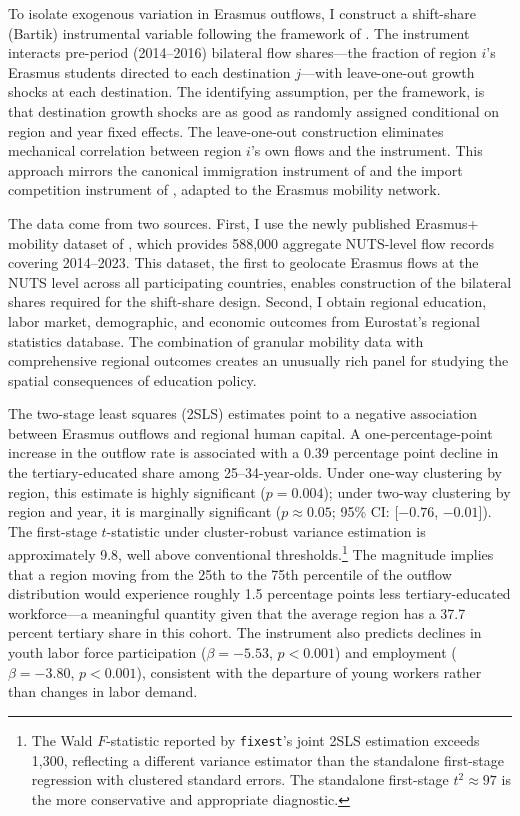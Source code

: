\documentclass[12pt]{article}
\begin{document}
To isolate exogenous variation in Erasmus outflows, I construct a shift-share (Bartik) instrumental variable following the framework of \citet{borusyak_hull_jaravel_2022}. The instrument interacts pre-period (2014--2016) bilateral flow shares---the fraction of region $i$'s Erasmus students directed to each destination $j$---with leave-one-out growth shocks at each destination. The identifying assumption, per the \citet{borusyak_hull_jaravel_2022} framework, is that destination growth shocks are as good as randomly assigned conditional on region and year fixed effects. The leave-one-out construction eliminates mechanical correlation between region $i$'s own flows and the instrument. This approach mirrors the canonical immigration instrument of \citet{card_2001} and the import competition instrument of \citet{autor_dorn_hanson_2013}, adapted to the Erasmus mobility network.

The data come from two sources. First, I use the newly published Erasmus+ mobility dataset of \citet{vaisanen_2025}, which provides 588,000 aggregate NUTS-level flow records covering 2014--2023. This dataset, the first to geolocate Erasmus flows at the NUTS level across all participating countries, enables construction of the bilateral shares required for the shift-share design. Second, I obtain regional education, labor market, demographic, and economic outcomes from Eurostat's regional statistics database. The combination of granular mobility data with comprehensive regional outcomes creates an unusually rich panel for studying the spatial consequences of education policy.

The two-stage least squares (2SLS) estimates point to a negative association between Erasmus outflows and regional human capital. A one-percentage-point increase in the outflow rate is associated with a 0.39 percentage point decline in the tertiary-educated share among 25--34-year-olds. Under one-way clustering by region, this estimate is highly significant ($p = 0.004$); under two-way clustering by region and year, it is marginally significant ($p \approx 0.05$; 95\% CI: [$-0.76$, $-0.01$]). The first-stage $t$-statistic under cluster-robust variance estimation is approximately 9.8, well above conventional thresholds.\footnote{The Wald $F$-statistic reported by \texttt{fixest}'s joint 2SLS estimation exceeds 1,300, reflecting a different variance estimator than the standalone first-stage regression with clustered standard errors. The standalone first-stage $t^2 \approx 97$ is the more conservative and appropriate diagnostic.} The magnitude implies that a region moving from the 25th to the 75th percentile of the outflow distribution would experience roughly 1.5 percentage points less tertiary-educated workforce---a meaningful quantity given that the average region has a 37.7 percent tertiary share in this cohort. The instrument also predicts declines in youth labor force participation ($\beta = -5.53$, $p < 0.001$) and employment ($\beta = -3.80$, $p < 0.001$), consistent with the departure of young workers rather than changes in labor demand.
\end{document}
